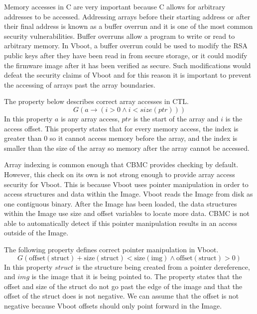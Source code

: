 Memory accesses in C are very important because C allows for arbitrary addresses to be accessed. 
Addressing arrays before their starting address or after their final address is known as a buffer overrun and it is one of the most common security vulnerabilities. 
Buffer overruns allow a program to write or read to arbitrary memory. 
In Vboot, a buffer overrun could be used to modify the RSA public keys after they have been read in from secure storage, or it could modify the firmware image after it has been verified as secure. 
Such modifications would defeat the security claims of Vboot and for this reason it is important to prevent the accessing of arrays past the array boundaries.

The property below describes correct array accesses in CTL. 
\begin{equation}
    G(a \to (i > 0 \land i < size(ptr)))
\end{equation}
In this property $a$ is any array access, $ptr$ is the start of the array and $i$ is the access offset.
This property states that for every memory access, the index is greater than 0 so it cannot access memory before the array,  and the index is smaller than the size of the array so memory after the array cannot be accessed.

Array indexing is common enough that CBMC provides checking by default.
However, this check on its own is not strong enough to provide array access security for Vboot. 
This is because Vboot uses pointer manipulation in order to access structures and data within the Image. 
Vboot reads the Image from disk as one contiguous binary. 
After the Image has been loaded, the data structures within the Image use size and offset variables to locate more data.
CBMC is not able to automatically detect if this pointer manipulation results in an access outside of the Image.

The following property defines correct pointer manipulation in Vboot. 
\begin{equation}
    G(\text{offset}(\text{struct}) + \text{size}(\text{struct}) <
    \text{size}(\text{img}) \land \text{offset}(\text{struct}) > 0)
\end{equation}
In this property $struct$ is the structure being created from a pointer dereference, and $img$ is the image that it is being pointed to.
The property states that the offset and size of the struct do not go past the edge of the image and that the offset of the struct does is not negative.
We can assume that the offset is not negative because Vboot offsets should only point forward in the Image.

